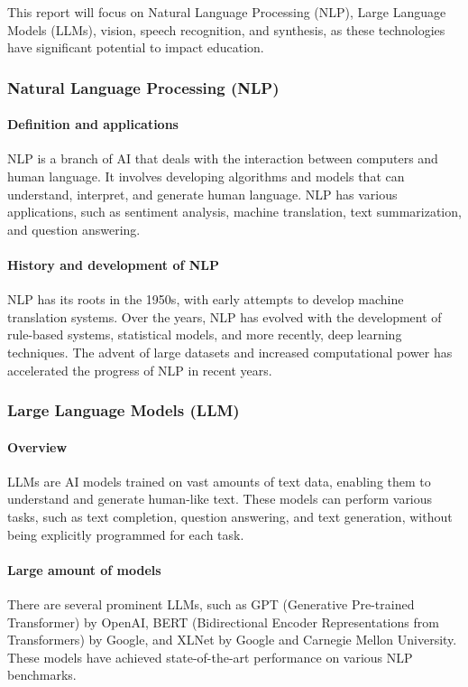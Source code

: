 \documentclass{article}
\begin{document}
This report will focus on Natural Language Processing (NLP), Large Language Models (LLMs), vision, speech recognition, and synthesis, as these technologies have significant potential to impact education.

\subsubsection{Natural Language Processing (NLP)}

\paragraph{Definition and applications}
NLP is a branch of AI that deals with the interaction between computers and human language. It involves developing algorithms and models that can understand, interpret, and generate human language. NLP has various applications, such as sentiment analysis, machine translation, text summarization, and question answering.

\paragraph{History and development of NLP}
NLP has its roots in the 1950s, with early attempts to develop machine translation systems. Over the years, NLP has evolved with the development of rule-based systems, statistical models, and more recently, deep learning techniques. The advent of large datasets and increased computational power has accelerated the progress of NLP in recent years.

\subsubsection{Large Language Models (LLM)}

\paragraph{Overview}
LLMs are AI models trained on vast amounts of text data, enabling them to understand and generate human-like text. These models can perform various tasks, such as text completion, question answering, and text generation, without being explicitly programmed for each task.

\paragraph{Large amount of models}
There are several prominent LLMs, such as GPT (Generative Pre-trained Transformer) by OpenAI, BERT (Bidirectional Encoder Representations from Transformers) by Google, and XLNet by Google and Carnegie Mellon University. These models have achieved state-of-the-art performance on various NLP benchmarks.
\end{document}
